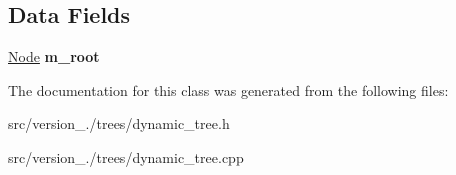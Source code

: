 \subsection*{Data Fields}
\begin{DoxyCompactItemize}
\item 
\mbox{\label{classez_1_1trees_1_1DynamicTree_aefa9c648dff841f4289f1991c6aa7673}} 
\hyperlink{classez_1_1trees_1_1DynamicNode}{Node} {\bfseries m\+\_\+root}
\end{DoxyCompactItemize}


The documentation for this class was generated from the following files\+:\begin{DoxyCompactItemize}
\item 
src/version\+\_./trees/dynamic\+\_\+tree.\+h\item 
src/version\+\_./trees/dynamic\+\_\+tree.\+cpp\end{DoxyCompactItemize}

